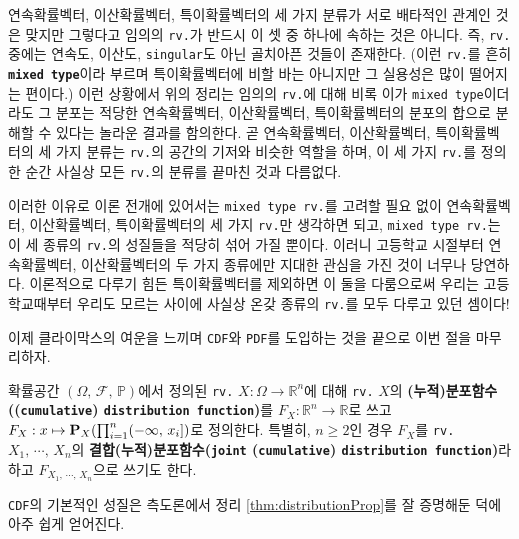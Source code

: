 연속확률벡터, 이산확률벡터, 특이확률벡터의 세 가지 분류가 서로 배타적인 관계인 것은 맞지만 그렇다고 임의의 \texttt{rv.}가 반드시 이 셋 중 하나에 속하는 것은 아니다. 즉, \texttt{rv.} 중에는 연속도, 이산도, \texttt{singular}도 아닌 골치아픈 것들이 존재한다. (이런 \texttt{rv.}를 흔히 \textbf{\texttt{mixed type}}이라 부르며 특이확률벡터에 비할 바는 아니지만 그 실용성은 많이 떨어지는 편이다.) 이런 상황에서 위의 정리는 임의의 \texttt{rv.}에 대해 비록 이가 \texttt{mixed type}이더라도 그 분포는 적당한 연속확률벡터, 이산확률벡터, 특이확률벡터의 분포의 합으로 분해할 수 있다는 놀라운 결과를 함의한다. 곧 연속확률벡터, 이산확률벡터, 특이확률벡터의 세 가지 분류는 \texttt{rv.}의 공간의 기저와 비슷한 역할을 하며, 이 세 가지 \texttt{rv.}를 정의한 순간 사실상 모든 \texttt{rv.}의 분류를 끝마친 것과 다름없다.

이러한 이유로 이론 전개에 있어서는 \texttt{mixed type rv.}를 고려할 필요 없이 연속확률벡터, 이산확률벡터, 특이확률벡터의 세 가지 \texttt{rv.}만 생각하면 되고, \texttt{mixed type rv.}는 이 세 종류의 \texttt{rv.}의 성질들을 적당히 섞어 가질 뿐이다. 이러니 고등학교 시절부터 연속확률벡터, 이산확률벡터의 두 가지 종류에만 지대한 관심을 가진 것이 너무나 당연하다. 이론적으로 다루기 힘든 특이확률벡터를 제외하면 이 둘을 다룸으로써 우리는 고등학교때부터 우리도 모르는 사이에 사실상 온갖 종류의 \texttt{rv.}를 모두 다루고 있던 셈이다!

이제 클라이막스의 여운을 느끼며 \texttt{\texttt{CDF}}와 \texttt{PDF}를 도입하는 것을 끝으로 이번 절을 마무리하자.

\begin{definition}
    확률공간 $(\Omega,\,\mathcal{F},\,\mathbb{P})$에서 정의된 \texttt{rv.} $X:\Omega\to\mathbb{R}^n$에 대해 \texttt{rv.} $X$의 \textbf{(누적)분포함수((\texttt{cumulative}) \texttt{distribution function})}를 $F_X:\mathbb{R}^n\to\mathbb{R}$로 쓰고 $F_X:x\mapsto\mathbf{P}_X(\prod_{i=1}^n(-\infty,\,x_i])$로 정의한다. 특별히, $n\geq2$인 경우 $F_X$를 \texttt{rv.} $X_1,\,\cdots,\,X_n$의 \textbf{결합(누적)분포함수(\texttt{joint} (\texttt{cumulative}) \texttt{distribution function})}라 하고 $F_{X_1,\,\cdots,\,X_n}$으로 쓰기도 한다.
\end{definition}

\texttt{CDF}의 기본적인 성질은 측도론에서 정리 \ref{thm:distributionProp}를 잘 증명해둔 덕에 아주 쉽게 얻어진다.

